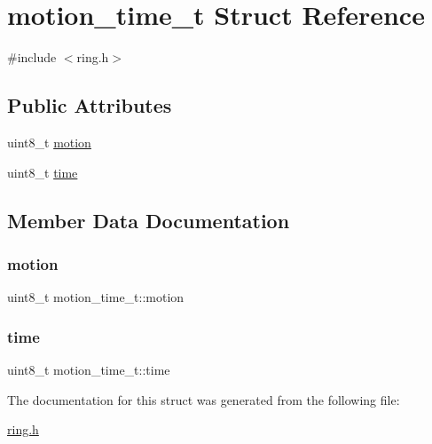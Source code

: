\hypertarget{structmotion__time__t}{}\section{motion\+\_\+time\+\_\+t Struct Reference}
\label{structmotion__time__t}


{\ttfamily \#include $<$ring.\+h$>$}

\subsection*{Public Attributes}
\begin{DoxyCompactItemize}
\item 
uint8\+\_\+t \hyperlink{structmotion__time__t_a32f90b7c0775800cee3056b3adca2040}{motion}
\item 
uint8\+\_\+t \hyperlink{structmotion__time__t_ae85eb141921db45d916cc792306475c9}{time}
\end{DoxyCompactItemize}


\subsection{Member Data Documentation}
\mbox{\label{structmotion__time__t_a32f90b7c0775800cee3056b3adca2040}} 
\subsubsection{\texorpdfstring{motion}{motion}}
{\footnotesize\ttfamily uint8\+\_\+t motion\+\_\+time\+\_\+t\+::motion}

\mbox{\label{structmotion__time__t_ae85eb141921db45d916cc792306475c9}} 
\subsubsection{\texorpdfstring{time}{time}}
{\footnotesize\ttfamily uint8\+\_\+t motion\+\_\+time\+\_\+t\+::time}



The documentation for this struct was generated from the following file\+:\begin{DoxyCompactItemize}
\item 
\hyperlink{ring_8h}{ring.\+h}\end{DoxyCompactItemize}
